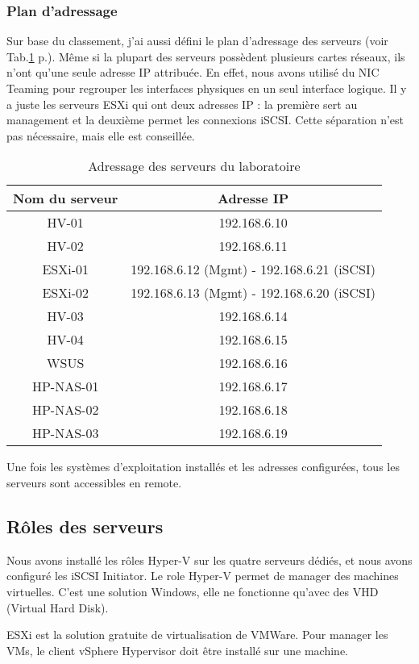 \subsubsection{Plan d'adressage}
Sur base du classement, j'ai aussi défini le plan d'adressage des serveurs (voir Tab.\ref{tab:addIP} p.\pageref{tab:addIP}).
Même si la plupart des serveurs possèdent plusieurs cartes réseaux, ils n'ont qu'une seule adresse IP attribuée.
En effet, nous avons utilisé du NIC Teaming pour regrouper les interfaces physiques en un seul interface logique.
Il y a juste les serveurs ESXi qui ont deux adresses IP : la première sert au management et la deuxième permet les connexions iSCSI.
Cette séparation n'est pas nécessaire, mais elle est conseillée.
\begin{table}
\centering
\begin{tabular}{cc}
\toprule
Nom du serveur & Adresse IP \\
\midrule
HV-01 & 192.168.6.10 \\ 
HV-02 & 192.168.6.11 \\ 
ESXi-01 & 192.168.6.12 (Mgmt) - 192.168.6.21 (iSCSI) \\ 
ESXi-02 & 192.168.6.13 (Mgmt) - 192.168.6.20 (iSCSI) \\ 
HV-03 & 192.168.6.14 \\ 
HV-04 & 192.168.6.15 \\ 
WSUS & 192.168.6.16 \\ 
HP-NAS-01 & 192.168.6.17 \\ 
HP-NAS-02 & 192.168.6.18 \\ 
HP-NAS-03 & 192.168.6.19 \\
\bottomrule
\end{tabular}
\caption{Adressage des serveurs du laboratoire}
\label{tab:addIP}
\end{table}

Une fois les systèmes d'exploitation installés et les adresses configurées, tous les serveurs sont accessibles en remote. 

\subsection{Rôles des serveurs}
Nous avons installé les rôles Hyper-V sur les quatre serveurs dédiés, et nous avons configuré les iSCSI Initiator. 
Le role Hyper-V permet de manager des machines virtuelles. 
C'est une solution Windows, elle ne fonctionne qu'avec des VHD (Virtual Hard Disk). 

ESXi est la solution gratuite de virtualisation de VMWare. 
Pour manager les VMs, le client vSphere Hypervisor doit être installé sur une machine.

